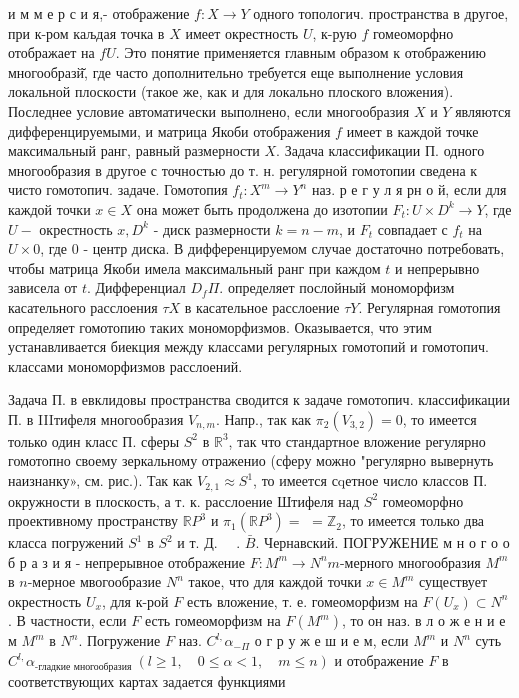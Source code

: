 \documentclass[10pt]{article}
\begin{document}
и м м е р с и я,- отображение $f: X \rightarrow Y$ одного топологич. пространства в другое, при к-ром каљдая точка в $X$ имеет окрестность $U$, к-рую $f$ гомеоморфно отображает на $f U$. Это понятие применяется главным образом к отображению многообразй̆, где часто дополнительно требуется еще выполнение условия локальной плоскости (такое же, как и для локально плоского вложения). Последнее условие автоматически выполнено, если многообразия $X$ и $Y$ являются дифференцируемыми, и матрица Якоби отображения $f$ имеет в каждой точке максимальный ранг, равный размерности $X$. Задача классификации П. одного многообразия в другое с точностью до т. н. регулярной гомотопии сведена к чисто гомотопич. задаче. Гомотопия $f_{t}: X^{m} \rightarrow Y^{n}$ наз. р е г у л я рн $о$ й, если для каждой точки $x \in X$ она может быть продолжена до изотопии $F_{t}: U \times D^{k} \rightarrow Y$, где $U-$ окрестность $x, D^{k}$ - диск размерности $k=n-m$, и $F_{t}$ совпадает с $f_{t}$ на $U \times 0$, где 0 - центр диска. В дифференцируемом случае достаточно потребовать, чтобы матрица Якоби имела максимальный ранг при каждом $t$ и непрерывно зависела от $t$. Дифференциал $D_{f} \Pi$. определяет послойный мономорфизм касательного расслоения $\tau X$ в касательное расслоение $\tau Y$. Регулярная гомотопия определяет гомотопию таких мономорфизмов. Оказывается, что этим устанавливается биекция между классами регулярных гомотопий и гомотопич. классами мономорфизмов расслоений.



Задача П. в евклидовы пространства сводится к задаче гомотопич. классификации П. в IIIтифеля многообразия $V_{n, m}$. Напр., так как $\pi_{2}\left(V_{3,2}\right)=0$, то имеется только один класс П. сферы $S^{2}$ в $\mathbb{R}^{3}$, так что стандартное вложение регулярно гомотопно своему зеркальному отраженио (сферу можно "регулярно вывернуть наизнанку», см. рис.). Так как $V_{2,1} \approx S^{1}$, то имеется сqетное число классов П. окружности в плоскость, а т. к. расслоение Штифеля над $S^{2}$ гомеоморфно проективному пространству $\mathbb{R} P^{3}$ и $\pi_{1}\left(\mathbb{R} P^{3}\right)=$ $=\mathbb{Z}_{2}$, то имеется только два класса погружений $S^{1}$ в $S^{2}$ и т. Д. $\quad$. $\bar{B}$. Чернавский. ПОГРУЖЕНИЕ м н о г о о б р а з и я - непрерывное отображение $F: M^{m} \rightarrow N^{n} m$-мерного многообразия $M^{m}$ в $n$-мерное мвогообразие $N^{n}$ такое, что для каждой точки $x \in M^{m}$ существует окрестность $U_{x}$, для к-рой $F$ есть вложение, т. е. гомеоморфизм на $F\left(U_{x}\right) \subset N^{n}$. В частности, если $F$ есть гомеоморфизм на $F\left(M^{m}\right)$, то он наз. в л о ж е н и е м $M^{m}$ в $N^{n}$. Погружение $F$ наз. $C^{l,} \alpha_{-\Pi}$ о г р у ж е ш и е м, если $M^{m}$ и $N^{n}$ суть $C^{l,} \alpha_{\text {-гладкие многообразия }}(l \geqslant 1, \quad 0 \leqslant \alpha<1, \quad m \leqslant n)$ и отображение $F$ в соответствующих картах задается функциями
\end{document}
